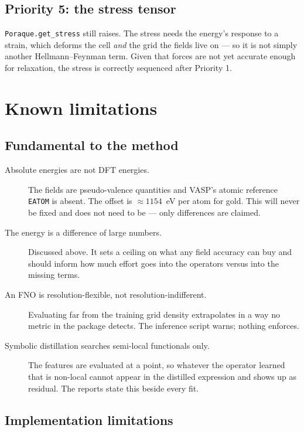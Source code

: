 \documentclass[11pt,a4paper]{report}
\newcommand{\opt}[1]{\texttt{#1}}
\newcommand{\pyclass}[1]{\texttt{#1}}
\begin{document}
\section{Priority 5: the stress tensor}

\pyclass{Poraque.get\_stress} still raises. The stress needs the energy's
response to a strain, which deforms the cell \emph{and} the grid the fields
live on --- so it is not simply another Hellmann--Feynman term. Given that
forces are not yet accurate enough for relaxation, the stress is correctly
sequenced after Priority 1.

\chapter{Known limitations}

\section{Fundamental to the method}

\begin{description}
\item[Absolute energies are not DFT energies.] The fields are pseudo-valence
  quantities and VASP's atomic reference \opt{EATOM} is absent. The offset is
  $\approx 1154$~eV per atom for gold. This will never be fixed and does not
  need to be --- only differences are claimed.
\item[The energy is a difference of large numbers.] Discussed above. It sets a
  ceiling on what any field accuracy can buy and should inform how much effort
  goes into the operators versus into the missing terms.
\item[An FNO is resolution-flexible, not resolution-indifferent.] Evaluating
  far from the training grid density extrapolates in a way no metric in the
  package detects. The inference script warns; nothing enforces.
\item[Symbolic distillation searches semi-local functionals only.] The features
  are evaluated at a point, so whatever the operator learned that is non-local
  cannot appear in the distilled expression and shows up as residual. The
  reports state this beside every fit.
\end{description}

\section{Implementation limitations}
\end{document}
